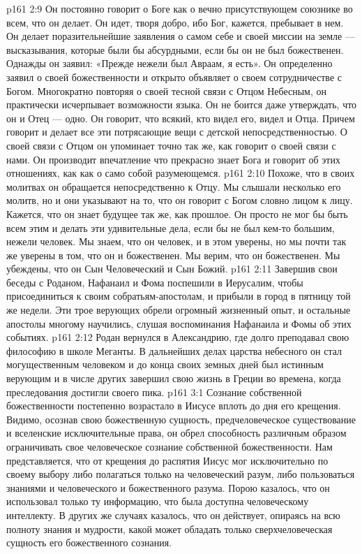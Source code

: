 \vs p161 2:9 \pc {}\bibnobreakspace Он постоянно говорит о Боге как о вечно присутствующем союзнике во всем, что он делает. Он идет, творя добро, ибо Бог, кажется, пребывает в нем. Он делает поразительнейшие заявления о самом себе и своей миссии на земле --- высказывания, которые были бы абсурдными, если бы он не был божественен. Однажды он заявил: «Прежде нежели был Авраам, я есть». Он определенно заявил о своей божественности и открыто объявляет о своем сотрудничестве с Богом. Многократно повторяя о своей тесной связи с Отцом Небесным, он практически исчерпывает возможности языка. Он не боится даже утверждать, что он и Отец --- одно. Он говорит, что всякий, кто видел его, видел и Отца. Причем говорит и делает все эти потрясающие вещи с детской непосредственностью. О своей связи с Отцом он упоминает точно так же, как говорит о своей связи с нами. Он производит впечатление что прекрасно знает Бога и говорит об этих отношениях, как как о само собой разумеющемся.
\vs p161 2:10 \pc {}\bibnobreakspace Похоже, что в своих молитвах он обращается непосредственно к Отцу. Мы слышали несколько его молитв, но и они указывают на то, что он говорит с Богом словно лицом к лицу. Кажется, что он знает будущее так же, как прошлое. Он просто не мог бы быть всем этим и делать эти удивительные дела, если бы не был кем\hyp{}то большим, нежели человек. Мы знаем, что он человек, и в этом уверены, но мы почти так же уверены в том, что он и божественен. Мы верим, что он божественен. Мы убеждены, что он Сын Человеческий и Сын Божий.
\vs p161 2:11 \pc Завершив свои беседы с Роданом, Нафанаил и Фома поспешили в Иерусалим, чтобы присоединиться к своим собратьям\hyp{}апостолам, и прибыли в город в пятницу той же недели. Эти трое верующих обрели огромный жизненный опыт, и остальные апостолы многому научились, слушая воспоминания Нафанаила и Фомы об этих событиях.
\vs p161 2:12 Родан вернулся в Александрию, где долго преподавал свою философию в школе Меганты. В дальнейших делах царства небесного он стал могущественным человеком и до конца своих земных дней был истинным верующим и в числе других завершил свою жизнь в Греции во времена, когда преследования достигли своего пика.
\vs p161 3:1 Сознание собственной божественности постепенно возрастало в Иисусе вплоть до дня его крещения. Видимо, осознав свою божественную сущность, предчеловеческое существование и вселенские исключительные права, он обрел способность различным образом ограничивать свое человеческое сознание собственной божественности. Нам представляется, что от крещения до распятия Иисус мог исключительно по своему выбору либо полагаться только на человеческий разум, либо пользоваться знаниями и человеческого и божественного разума. Порою казалось, что он использовал только ту информацию, что была доступна человеческому интеллекту. В других же случаях казалось, что он действует, опираясь на всю полноту знания и мудрости, какой может обладать только сверхчеловеческая сущность его божественного сознания.
